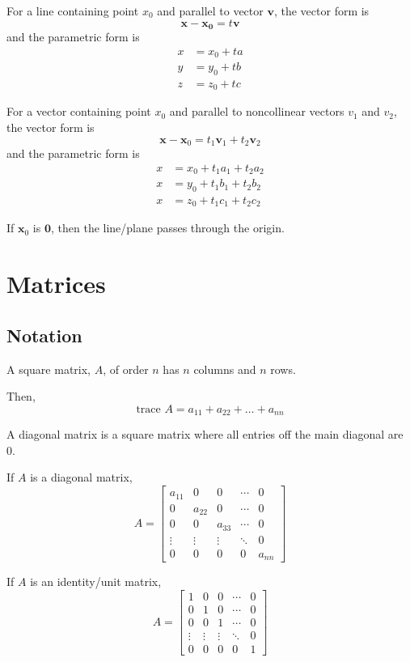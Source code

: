 \documentclass[../linear-algebra.tex]{subfiles}
\begin{document}
\bigskip

\noindent For a line containing point $x_0$ and parallel to vector $\mathbf{v}$,
the vector form is
\[\mathbf{x} - \mathbf{x_0} = t\mathbf{v}\]
and the parametric form is
\begin{align*}
    x &= x_0 + ta \\
    y &= y_0 + tb \\
    z &= z_0 + tc
\end{align*}

\noindent For a vector containing point $x_0$ and parallel to noncollinear vectors $v_1$ and $v_2$,
the vector form is 
\[\mathbf{x} - \mathbf{x}_0 = t_1\mathbf{v}_1 + t_2\mathbf{v}_2\]
and the parametric form is
\begin{align*}
    x &= x_0 + t_1a_1 + t_2a_2 \\
    x &= y_0 + t_1b_1 + t_2b_2 \\
    x &= z_0 + t_1c_1 + t_2c_2
\end{align*}

\noindent If $\mathbf{x}_0$ is $\mathbf{0}$, then the line/plane passes through the origin.

\newpage

\section{Matrices}
\subsection{Notation}
A square matrix, $A$, of order $n$ has $n$ columns and $n$ rows.

\noindent Then,
\[\text{trace } A = a_{11} + a_{22} + \ldots + a_{nn}\]

\noindent A diagonal matrix is a square matrix where all entries off the main
diagonal are 0.

\noindent If $A$ is a diagonal matrix,
\[A = \begin{bmatrix}
    a_{11} & 0 & 0 & \cdots & 0 \\
    0 & a_{22} & 0 & \cdots & 0 \\
    0 & 0 & a_{33} & \cdots & 0 \\
    \vdots & \vdots & \vdots & \ddots & 0\\
    0 & 0 & 0 & 0 & a_{nn}
\end{bmatrix}\]

\noindent If $A$ is an identity/unit matrix,
    \[A = \begin{bmatrix}
    1 & 0 & 0 & \cdots & 0 \\
    0 & 1 & 0 & \cdots & 0 \\
    0 & 0 & 1 & \cdots & 0 \\
    \vdots & \vdots & \vdots & \ddots & 0\\
    0 & 0 & 0 & 0 & 1
\end{bmatrix}\]
\end{document}
